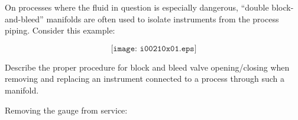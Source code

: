 

On processes where the fluid in question is especially dangerous, ``double block-and-bleed'' manifolds are often used to isolate instruments from the process piping.  Consider this example:

$$\texttt{[image: i00210x01.eps]}$$

Describe the proper procedure for block and bleed valve opening/closing when removing and replacing an instrument connected to a process through such a manifold.







Removing the gauge from service:

